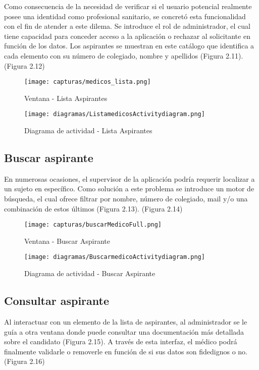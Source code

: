 \documentclass[11pt,spanish,
		listoftables,listoffigures]
		{tfgplantilla}
\begin{document}
Como consecuencia de la necesidad de verificar si el usuario potencial realmente posee una identidad como profesional sanitario, se concretó esta funcionalidad con el fin de atender a este dilema. Se introduce el rol de administrador, el cual tiene capacidad para conceder acceso a la aplicación o rechazar al solicitante en función de los datos. Los aspirantes se muestran en este catálogo que identifica a cada elemento con su número de colegiado, nombre y apellidos (Figura 2.11). (Figura 2.12)

\begin{figure}[H]
\centering
\texttt{[image: capturas/medicos\_lista.png]}
\caption{Ventana -  Lista Aspirantes}
\end{figure}

\begin{figure}[H]
\centering
\texttt{[image: diagramas/ListamedicosActivitydiagram.png]}
\caption{Diagrama de actividad -  Lista Aspirantes}
\end{figure}

\vfill
\subsection {Buscar aspirante}

En numerosas ocasiones, el supervisor de la aplicación podría requerir localizar a un sujeto en específico. Como solución a este problema se introduce un motor de búsqueda, el cual ofrece filtrar por nombre, número de colegiado, mail y/o una combinación de estos últimos (Figura 2.13). (Figura 2.14)

\begin{figure}[H]
\centering
\texttt{[image: capturas/buscarMedicoFull.png]}
\caption{Ventana -  Buscar Aspirante}
\end{figure}

\newpage
\begin{figure}[H]
\centering
\texttt{[image: diagramas/BuscarmedicoActivitydiagram.png]}
\caption{Diagrama de actividad -  Buscar Aspirante}
\end{figure}

\vfill
\subsection {Consultar aspirante}

Al interactuar con un elemento de la lista de aspirantes, al administrador se le guía a otra ventana donde puede consultar una documentación más detallada sobre el candidato (Figura 2.15). A través de esta interfaz, el médico podrá finalmente validarle o removerle en función de si sus datos son fidedignos o no. (Figura 2.16)
\end{document}
